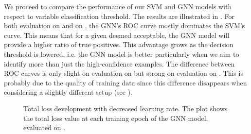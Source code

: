 \documentclass[
	fontsize=10pt, %
	twoside=false, %
	secnumdepth=1, %
  toc=indentunnumbered %
]{kaobook}
\begin{document}
We proceed to compare the performance of our SVM and GNN models with respect to
variable classification threshold. The results are illustrated in
. For both evaluation on \PDMap{} and on \ReconMap{},
the GNN's ROC curve mostly dominates the SVM's curve. This means that for a given
\FPR{} deemed acceptable, the GNN model will provide a higher ratio of true
positives. This advantage grows as the decision threshold is lowered, i.e. the
GNN model is better particularly when we aim to identify more than just the
high-confidence examples. The difference between ROC curves is only slight on
evaluation on \PDMap{} but strong on evaluation on \ReconMap{}. This is probably
due to the quality of training data since this difference disappears when
considering a slightly different setup (see ).

\begin{figure}[h]
  \centering
  \begin{subfigure}[h]{0.49\linewidth}
  \end{subfigure}
  \caption{Total loss development with decreased learning rate. The plot shows
    the total loss value at each training epoch of the GNN model, evaluated on
    \ReconMap{}.}
  \label{fig:svm-repro-lowlr-reconmapolder-loss}
\end{figure}
\end{document}

